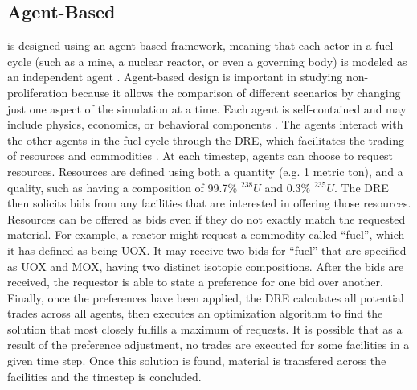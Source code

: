 \subsection{Agent-Based}
\Cyclus is designed using an agent-based framework, meaning that each actor  in a fuel cycle (such as a mine, a nuclear reactor, or even a governing body) is modeled as an independent agent \cite{jennings_agent-based_2000, taylor2014agent}. Agent-based design is important in studying non-proliferation because it allows the comparison of different scenarios by changing just one aspect of the simulation at a time. Each agent is self-contained and may include physics, economics, or behavioral components \cite{huff_open_2011,gidden_agent-based_2013,gidden_agent-based_2015}.  The agents interact with the other agents in the fuel cycle through the \gls{DRE}, which facilitates the trading of resources and commodities \cite{gidden_agent-based_2014}.  At each timestep, agents can choose to request resources.  Resources are defined using both a quantity (e.g. 1 metric ton), and a quality, such as having a composition of 99.7\% $^{238}U$ and 0.3\% $^{235}U$.  The \gls{DRE} then solicits bids from any facilities that are interested in offering those resources. Resources can be offered as bids even if they do not exactly match the requested material. For example, a reactor might request a commodity called ``fuel'', which it has defined as being \gls{UOX}.  It may receive two bids for ``fuel'' that are specified as \gls{UOX} and \gls{MOX}, having two distinct isotopic compositions. After the bids are received, the requestor is able to state a preference for one bid over another. Finally, once the preferences have been applied, the \gls{DRE} calculates all potential trades across all agents, then executes an optimization algorithm to find the solution that most closely fulfills a maximum of requests. It is possible that as a result of the preference adjustment, no trades are executed for some facilities in a given time step.  Once this solution is found, material is transfered across the facilities and the timestep is concluded.

